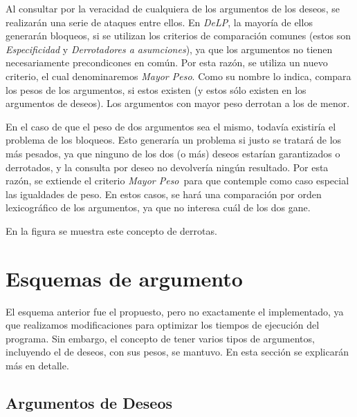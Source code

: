 \documentclass[oneside]{book}
\begin{document}
Al consultar por la veracidad de cualquiera de los argumentos de los deseos, se 
realizarán una serie de ataques entre ellos. En \textit{DeLP}, la mayoría de ellos
generarán bloqueos, si se 
utilizan los criterios de comparación comunes (estos son \textit{Especificidad} y 
\textit{Derrotadores a asumciones}), ya que los argumentos no tienen necesariamente 
precondicones en común. Por esta razón, se utiliza un nuevo criterio, el cual 
denominaremos \textit{Mayor Peso}. Como su nombre lo indica, compara los pesos de los 
argumentos, si estos existen (y estos sólo existen en los argumentos de deseos). Los 
argumentos con mayor peso derrotan a los de menor.

En el caso de que el peso de dos argumentos sea el mismo, todavía existiría el problema 
de los bloqueos. Esto generaría un problema si justo se tratará de los más pesados, ya 
que ninguno de los dos (o más) deseos estarían garantizados o derrotados, y la consulta
por deseo no devolvería ningún resultado. Por esta razón, se extiende el criterio 
\textit{Mayor Peso}\ para que contemple como caso especial las igualdades de peso. En 
estos casos, se hará una comparación por orden lexicográfico de los argumentos, ya que
no interesa cuál de los dos gane. 

En la figura %
se muestra este concepto de derrotas. %


\section{Esquemas de argumento}

\label{sec:esquemasArgumento}


El esquema anterior fue el propuesto, pero no exactamente el implementado, ya que
realizamos modificaciones para optimizar los tiempos de ejecución del programa. Sin 
embargo, el concepto de tener varios tipos de argumentos, incluyendo el de deseos, con sus
pesos, se mantuvo. En esta sección se explicarán más en detalle.

\subsection{Argumentos de Deseos}
\end{document}
